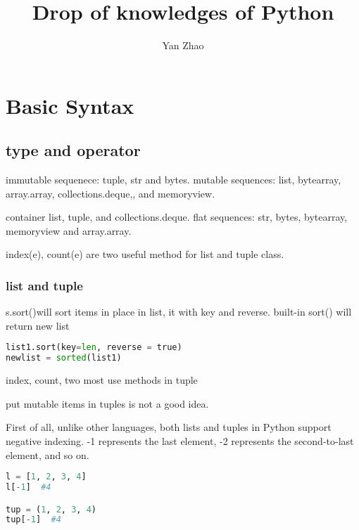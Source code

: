 \documentclass[a4paper,12pt,twoside]{book}
\begin{document}

\title{Drop of knowledges of Python}
\author{Yan Zhao}
\date{}\maketitle


	
\chapter{Basic Syntax}

\section{type and operator}

immutable sequenece: tuple, str and bytes. mutable sequences: list, bytearray, array.array, collections.deque,, and memoryview. 
	
container list, tuple, and collections.deque. flat sequences: str, bytes, bytearray, memoryview and array.array. 
	
index(e), count(e) are two useful method for list and tuple class.
	

\subsection{list and tuple}

	s.sort()will sort items in place in list, it with key and reverse. built-in sort() will return new list
\begin{lstlisting}[frame=single, language=Python]
list1.sort(key=len, reverse = true)
newlist = sorted(list1)
\end{lstlisting}  


index, count, two most use methods in tuple

put mutable items in tuples is not a good idea.

First of all, unlike other languages, both lists and tuples in Python support negative indexing. -1 represents the last element, -2 represents the second-to-last element, and so on.

\begin{lstlisting}[frame=single, language=Python]
l = [1, 2, 3, 4]
l[-1]  #4

tup = (1, 2, 3, 4)
tup[-1]  #4
\end{lstlisting}  
\end{document}
